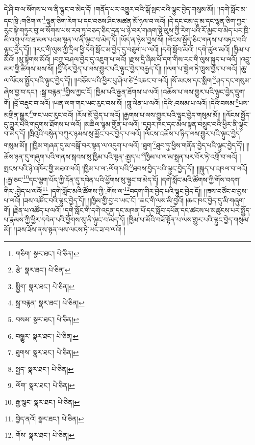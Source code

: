 དེ་ཤི་བ་ལ་སོགས་པ་ལ་ནི་ལྟུང་བ་མེད་དོ། །གནོད་པར་འགྱུར་བའི་སྒོ་སྤང་བའི་ལྟུང་བྱེད་གསུམ་མོ།། །།དགེ་སློང་མ་དང་ཁྲི་:གཅིག་ལ་\footnote{གཅིག་  སྣར་ཐང་།  པེ་ཅིན། }ལྷན་ཅིག་རེག་པ་དང་བཅས་ཤིང་མཚན་མོ་ཉལ་བ་ལའོ། །དེ་དང་ངམ་དུ་མ་དང་ལྷན་ཅིག་ཀྱང་རུང་སྟེ་གཏུར་བུ་ལ་སོགས་པས་རབ་ཏུ་བཅད་ཅིང་དྲན་པ་ཉེ་བར་གཞག་སྟེ་ལུས་ཀྱི་རེག་པའི་རོ་མྱང་བ་མེད་པར་ཁྲི་མི་འགུལ་བ་ཐ་མལ་པའམ་སྟན་ལ་ནི་ལྟུང་བ་མེད་དོ། །ཡོད་ན་ཉེས་བྱས་སོ། །ལོངས་སྤྱོད་ཅིང་གནས་པ་བཏང་བའི་ལྟུང་བྱེད་དོ།། །།རང་གི་ལུས་ཀྱི་དྲིལ་ཕྱི་དགེ་སློང་མ་བྱེད་དུ་བཅུག་པ་ལའོ། །དགེ་སློབ་མའོ། །དགེ་ཚུལ་མའོ། །ཁྱིམ་པ་མོའོ། །མུ་སྟེགས་མོའོ། །བཀྲུ་བཤལ་བྱེད་དུ་འཇུག་པ་ལའོ། །རྫས་དྲི་ཞིམ་པོ་དག་གིས་རང་གི་ལུས་སྐུད་པ་ལའོ། །འབྲུ་མར་གྱི་ཚིགས་མས་སོ། །བྱི་དོར་བྱེད་པ་ལས་གྱུར་པའི་ལྟུང་བྱེད་བརྒྱད་དོ།། །།ལག་པ་སྦྲེལ་ཏེ་ཁྲུས་བྱེད་པ་ལའོ། །ཆུ་ལ་ལོངས་སྤྱོད་པའི་ལྟུང་བྱེད་དོ།། །།བཅོས་པའི་ཕྱིར་པུ་ཤེལ་ཙེ་\footnote{རྩེ་  སྣར་ཐང་།  པེ་ཅིན། }འཆང་བ་ལའོ། །སོ་མངས་དང་སྨིག་\footnote{སྨྱིག་  སྣར་ཐང་།  པེ་ཅིན། }ཤད་དང་གསུམ་ཞེས་བྱ་བ་དང་། :སྒྲ་བརྙན་\footnote{སྐྲ་བརྙན་  སྣར་ཐང་།  པེ་ཅིན། }གྱིས་ཀྱང་ངོ། །ཁྱིམ་པའི་རྒྱན་ཐོགས་པ་ལའོ། །འཆོས་པ་ལས་གྱུར་པའི་ལྟུང་བྱེད་དྲུག་གོ། །བྲོ་བརྡུང་བ་ལའོ། །ཡན་ལག་གང་ཡང་རུང་བས་སོ། །གླུ་ལེན་པ་ལའོ། །དེའི་:བསམ་པ་ལའོ། །དེའི་བསམ་\footnote{བསམ་  སྣར་ཐང་།  པེ་ཅིན། }པས་མགྲིན་སྒྱུར་\footnote{བསྒྱུར་  སྣར་ཐང་།  པེ་ཅིན། }གང་ཡང་རུང་བའོ། །རོལ་མོ་བྱེད་པ་ལའོ། །རྒྱགས་པ་ལས་གྱུར་པའི་ལྟུང་བྱེད་གསུམ་མོ།། །།ལོངས་སྤྱོད་དུ་གྱུར་པའི་གདུགས་ཐོགས་པ་ལའོ། །མཆིལ་ལྷམ་གྱོན་པ་ལའོ། །དབྱར་ཁང་དང་མལ་སྟན་བསྲུང་བའི་ཕྱིར་ནི་ལྟུང་བ་མེད་དོ། །ཁྲིའུའི་བསྙེན་བཀུར་ཉམས་སུ་མྱོང་བར་བྱེད་པ་ལའོ། །ལོངས་འཆོས་པ་ཉིད་ལས་གྱུར་པའི་ལྟུང་བྱེད་གསུམ་མོ།། །།ཁྱིམ་གཞན་དུ་མ་བསྒོ་བར་སྟན་ལ་འདུག་པ་ལའོ། །ཐུག་\footnote{ཐུགས་  སྣར་ཐང་།  པེ་ཅིན། }ཐུབ་ཏུ་ཕྱིས་གནོན་བྱེད་པའི་ལྟུང་བྱེད་དོ།། །།ཆོས་ཉན་དུ་གཞུག་པའི་གནས་སྐབས་སུ་ཁྱིམ་པའི་སྟན་:སྤྱད་པ་\footnote{སྤྱད་  སྣར་ཐང་།  པེ་ཅིན། }ཁྱིམ་པ་ལ་མ་སྦྲན་པར་བོར་ཏེ་འགྲོ་བ་ལའོ། །སྤངས་པའི་ཉེ་འཁོར་གྱི་མཐའ་ལའོ། །ཁྱིམ་པ་ལ་:ལོག་པའི་\footnote{ལོག་  སྣར་ཐང་།  པེ་ཅིན། }ཐབས་བྱེད་པའི་ལྟུང་བྱེད་དོ།། །།སྐུད་པ་འཁལ་བ་ལའོ། །:རྒྱ་ཅང་\footnote{རྒྱ་ལྕང་  སྣར་ཐང་།  པེ་ཅིན། }དང་ལྕག་པོད་ཀྱི་དོན་དུ་དབེན་པའི་ཕྱོགས་སུ་ལྟུང་བ་མེད་དོ། །དགེ་སློང་མའི་ཚོགས་ཀྱི་གོས་བདག་གིར་:བྱེད་པ་ལའོ།\footnote{བྱེད་ནའོ།  སྣར་ཐང་།  པེ་ཅིན། } །དགེ་སློང་མའི་ཚོགས་ཀྱི་:གོས་ལ་\footnote{གོས་  སྣར་ཐང་།  པེ་ཅིན། }བདག་གིར་བྱེད་པའི་ལྟུང་བྱེད་དོ།། །།ཟས་བཙོང་བ་བྱས་པ་ལའོ། །ཟས་འཚོང་བའི་ལྟུང་བྱེད་དོ།། །།ཁྱིམ་གྱི་བྱ་བ་ཡང་ངོ། །ཆང་གི་ལས་མི་བྱའོ། །ཆང་ཁང་བྱེད་དུ་མི་གཞུག་གོ། །རྗེན་པ་འཚོད་པ་ལའོ། །དགེ་སློང་གི་དགེ་འདུན་དང་མཁན་པོ་དང་སློབ་དཔོན་དང་ཚངས་པ་མཚུངས་པར་སྤྱོད་པ་རྣམས་ཀྱི་ཕྱིར་དབེན་པའི་ཕྱོགས་སུ་ནི་ལྟུང་བ་མེད་དོ། །ཁྱིམ་པ་མོའི་བཟོ་སྟོན་པ་ལས་གྱུར་པའི་ལྟུང་བྱེད་གསུམ་མོ།། །།ཟས་ཟོས་ནས་སྟན་ལས་ལངས་ཏེ་ཡང་ཟ་བ་ལའོ། །
